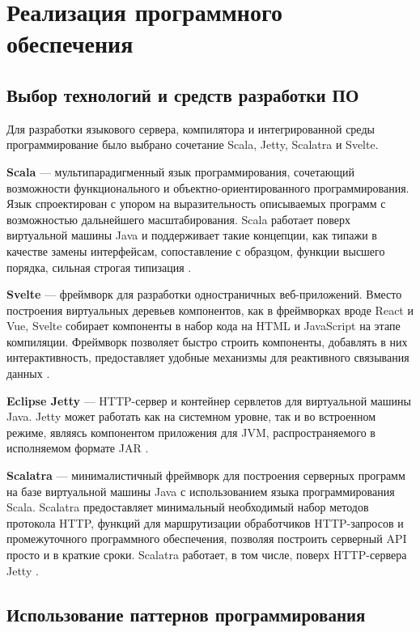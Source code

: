 \chapter{Реализация программного обеспечения}\label{ch:ch3}

\section{Выбор технологий и средств разработки ПО}\label{sec:ch3/sect1}

Для разработки языкового сервера, компилятора и интегрированной среды
программирование было выбрано сочетание Scala, Jetty, Scalatra и Svelte.

\textbf{Scala} --- мультипарадигменный язык программирования, сочетающий
возможности функционального и объектно-ориентированного программирования.
Язык спроектирован с упором на выразительность описываемых программ
с возможностью дальнейшего масштабирования. Scala работает
поверх виртуальной машины Java и поддерживает такие концепции, как
типажи в качестве замены интерфейсам, сопоставление с образцом,
функции высшего порядка, сильная строгая типизация \cite{scala}.

\textbf{Svelte} --- фреймворк для разработки одностраничных
веб-приложений. Вместо построения виртуальных деревьев компонентов,
как в фреймворках вроде React и Vue, Svelte собирает компоненты
в набор кода на HTML и JavaScript на этапе компиляции.
Фреймворк позволяет быстро строить компоненты, добавлять
в них интерактивность, предоставляет удобные механизмы
для реактивного связывания данных \cite{svelte}. 

\textbf{Eclipse Jetty} --- HTTP-сервер и контейнер сервлетов
для виртуальной машины Java. Jetty может работать как
на системном уровне, так и во встроенном режиме, являясь компонентом
приложения для JVM, распространяемого в исполняемом формате
JAR \cite{jetty}. 

\textbf{Scalatra} --- минималистичный фреймворк для построения
серверных программ на базе виртуальной машины Java с использованием
языка программирования Scala. Scalatra предоставляет
минимальный необходимый набор методов протокола HTTP, функций
для маршрутизации обработчиков HTTP-запросов и промежуточного программного
обеспечения, позволяя построить серверный API просто и в краткие сроки.
Scalatra работает, в том числе, поверх HTTP-сервера Jetty \cite{scalatra}.

\section{Использование паттернов программирования}\label{sec:ch3/sect2}

